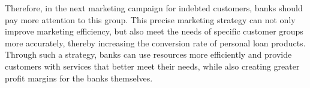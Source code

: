 \documentclass[12pt]{article}
\begin{document}
Therefore, in the next marketing campaign for indebted customers, banks should pay more attention to this group. This precise marketing strategy can not only improve marketing efficiency, but also meet the needs of specific customer groups more accurately, thereby increasing the conversion rate of personal loan products. Through such a strategy, banks can use resources more efficiently and provide customers with services that better meet their needs, while also creating greater profit margins for the banks themselves.

  

\end{document}
